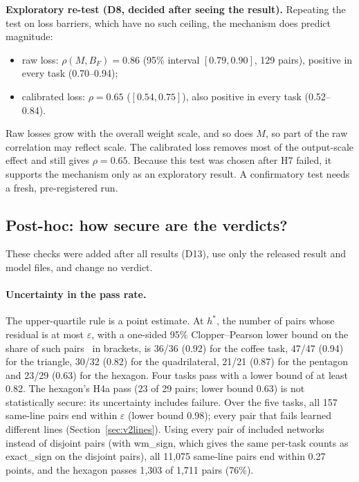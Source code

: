 \documentclass[11pt]{article}
\newcommand{\md}[1]{\textsf{#1}}
\newcommand{\eps}{\varepsilon}
\begin{document}
\textbf{Exploratory re-test (D8, decided after seeing the result).} Repeating the test on loss barriers, which have no such ceiling, the mechanism does predict magnitude:
\begin{itemize}[leftmargin=*]
\item raw loss: $\rho(M, B_F) = 0.86$ (95\% interval $[0.79, 0.90]$, 129 pairs), positive in every task (0.70--0.94);
\item calibrated loss: $\rho = 0.65$ ($[0.54, 0.75]$), also positive in every task (0.52--0.84).
\end{itemize}
Raw losses grow with the overall weight scale, and so does $M$, so part of the raw correlation may reflect scale. The calibrated loss removes most of the output-scale effect and still gives $\rho = 0.65$. Because this test was chosen after H7 failed, it supports the mechanism only as an exploratory result. A confirmatory test needs a fresh, pre-registered run.

\subsection{Post-hoc: how secure are the verdicts?}
\label{sec:v2posthoc}

These checks were added after all results (D13), use only the released result and model files, and change no verdict.

\paragraph{Uncertainty in the pass rate.} The upper-quartile rule is a point estimate. At $h^*$, the number of pairs whose residual is at most $\eps$, with a one-sided 95\% Clopper--Pearson lower bound on the share of such pairs~\cite{clopper1934use} in brackets, is 36/36 (0.92) for the coffee task, 47/47 (0.94) for the triangle, 30/32 (0.82) for the quadrilateral, 21/21 (0.87) for the pentagon and 23/29 (0.63) for the hexagon. Four tasks pass with a lower bound of at least 0.82. The hexagon's H4a pass (23 of 29 pairs; lower bound 0.63) is not statistically secure: its uncertainty includes failure. Over the five tasks, all 157 same-line pairs end within $\eps$ (lower bound 0.98); every pair that fails learned different lines (Section~\ref{sec:v2lines}). Using every pair of included networks instead of disjoint pairs (with \md{wm\_sign}, which gives the same per-task counts as \md{exact\_sign} on the disjoint pairs), all 11{,}075 same-line pairs end within 0.27 points, and the hexagon passes 1{,}303 of 1{,}711 pairs (76\%).
\end{document}
